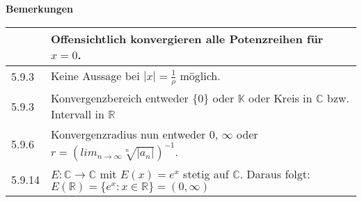 \begin{table}[H]
\begin{tabularx}{\textwidth}{X m{16cm}}
        \bottomrule
    \end{tabularx}
    \end{table}

    \noindent
    \textbf{Bemerkungen}
    \begin{table}[H]
    \begin{tabularx}{\textwidth}{X m{16cm}}
        \toprule

              & Offensichtlich konvergieren alle Potenzreihen für $x = 0$. \\
        \midrule
        5.9.3 & Keine Aussage bei $|x|=\frac{1}{\rho}$ möglich. \\
        \midrule
        5.9.3 & Konvergenzbereich entweder $\{0\}$ oder $\mathbb{K}$ oder Kreis in $\mathbb{C}$ bzw. Intervall in $\mathbb{R}$ \\
        \midrule
        5.9.6 & Konvergenzradius nun entweder $0$, $\infty$ oder $r = (lim_{n \rightarrow \infty} \sqrt[n]{|a_n|})^{-1}$. \\
        \midrule
        5.9.14& $E: \mathbb{C} \rightarrow \mathbb{C}$ mit $E(x) = e^x$ stetig auf $\mathbb{C}$. \hfill \break
                Daraus folgt: $E(\mathbb{R}) = \{e^x: x \in \mathbb{R}\} = (0, \infty)$ \\ 

        \bottomrule
    \end{tabularx}
    \end{table}

